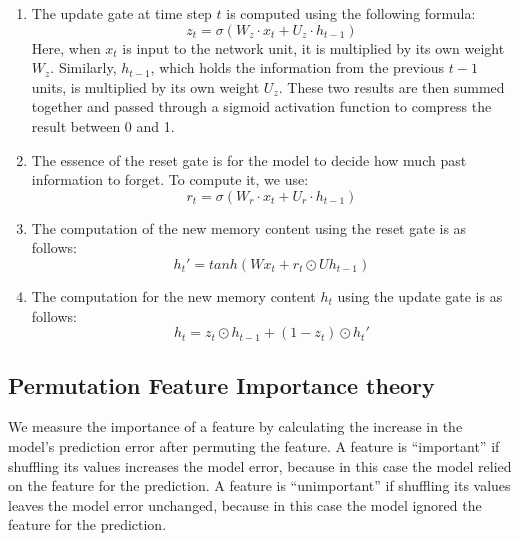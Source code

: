 \documentclass[12pt, a4paper, oneside]{article}
\theoremstyle{break}
\begin{document}
\begin{enumerate}
    \item 
    The update gate at time step $t$ is computed using the following formula:  
    $$  z_t = \sigma(W_z \cdot x_t + U_z \cdot h_{t-1})  $$  
    Here, when $x_t$ is input to the network unit, 
    it is multiplied by its own weight $W_z$. 
    Similarly, $h_{t-1}$, which holds the information from the previous $t-1$ units, 
    is multiplied by its own weight $U_z$. These two results are then summed together 
    and passed through a sigmoid activation function to compress the result between 0 and 1. 
  
    \item 
    The essence of the reset gate is for the model to decide how much past information to forget. To compute it, we use:  
    $$  r_t = \sigma(W_r \cdot x_t + U_r \cdot h_{t-1})  $$  

    \item 
    The computation of the new memory content using the reset gate is as follows:  
    $$ h_t'= tanh(Wx_t+r_t\odot Uh_{t-1})$$

    \item 
    The computation for the new memory content $h_t$ using the update gate is as follows:  
    $$ h_t=z_t\odot h_{t-1}+(1-z_t)\odot h_t'$$ 
\end{enumerate}

\subsection{Permutation Feature Importance theory}

We measure the importance of a feature by calculating the increase in the model’s prediction error 
after permuting the feature. A feature is “important” if shuffling its values increases the model error, 
because in this case the model relied on the feature for the prediction. A feature is “unimportant” if 
shuffling its values leaves the model error unchanged, because in this case the model ignored the feature 
for the prediction. 
\end{document}
